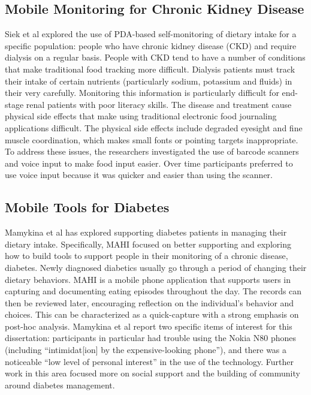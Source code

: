 \subsection{Mobile Monitoring for Chronic Kidney Disease}

Siek et al \citep{siek_bridging_2009, siek_design_2006, siek_when_2006} explored the use of PDA-based self-monitoring of dietary intake for a specific population: people who have chronic kidney disease (CKD) and require dialysis on a regular basis. People with CKD tend to have a number of conditions that make traditional food tracking more difficult. Dialysis patients must track their intake of certain nutrients (particularly sodium, potassium and fluids) in their  very carefully. Monitoring this information is particularly difficult for end-stage renal patients with poor literacy skills. The disease and treatment cause physical side effects that make using traditional electronic food journaling applications difficult. The physical side effects include degraded eyesight and fine muscle coordination, which makes small fonts or pointing targets inappropriate. To address these issues, the researchers investigated the use of barcode scanners and voice input to make food input easier. Over time participants preferred to use voice input because it was quicker and easier than using the scanner. 

\subsection{Mobile Tools for Diabetes}
Mamykina et al \citep{mamykina_examining_2011, mamykina_mahi:_2008} has explored supporting diabetes patients in managing their dietary intake. Specifically, MAHI focused on better supporting and exploring how to build tools to support people in their monitoring of a chronic disease, diabetes. Newly diagnosed diabetics usually go through a period of changing their dietary behaviors. MAHI is a mobile phone application that supports users in capturing and documenting eating episodes throughout the day. The records can then be reviewed later, encouraging reflection on the individual's behavior and choices. This can be characterized as a quick-capture with a strong emphasis on post-hoc analysis. Mamykina et al report \citep{mamykina_mahi:_2008} two specific items of interest for this dissertation: participants in particular had trouble using the Nokia N80 phones (including ``intimidat[ion] by the expensive-looking phone''), and there was a noticeable ``low level of personal interest'' in the use of the technology. Further work in this area focused more on social support and the building of community around diabetes management. 

